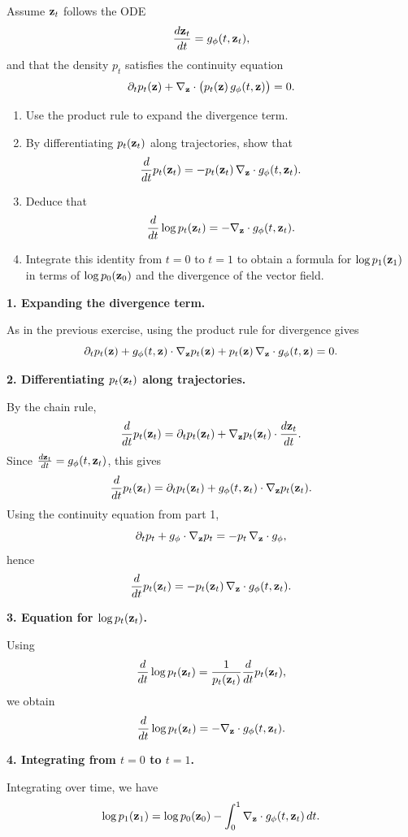 \begin{exercise}
Assume \({ \mathbf{z}}_t\) follows the ODE
\[
\frac{d{ \mathbf{z}}_t}{dt}=g_\phi(t,{ \mathbf{z}}_t),
\]
and that the density \(p_t\) satisfies the continuity equation
\[
\partial_t p_t({ \mathbf{z}})+\nabla_{ \mathbf{z}}\cdot\bigl(p_t({ \mathbf{z}})\,g_\phi(t,{ \mathbf{z}})\bigr)=0.
\]

\begin{enumerate}
\item Use the product rule to expand the divergence term.
\item By differentiating \(p_t({ \mathbf{z}}_t)\) along trajectories, show that
\[
\frac{d}{dt} p_t({ \mathbf{z}}_t)
=
-p_t({ \mathbf{z}}_t)\,\nabla_{ \mathbf{z}}\cdot g_\phi(t,{ \mathbf{z}}_t).
\]
\item Deduce that
\[
\frac{d}{dt}\log p_t({ \mathbf{z}}_t)
=
-\nabla_{ \mathbf{z}}\cdot g_\phi(t,{ \mathbf{z}}_t).
\]
\item Integrate this identity from \(t=0\) to \(t=1\) to obtain a formula for \(\log p_1({ \mathbf{z}}_1)\) in terms of \(\log p_0({ \mathbf{z}}_0)\) and the divergence of the vector field.
\end{enumerate}
\end{exercise}

\begin{solution}

\textbf{1. Expanding the divergence term.}

As in the previous exercise, using the product rule for divergence gives 
\[
\partial_t p_t({ \mathbf{z}})
+
g_\phi(t,{ \mathbf{z}})\cdot\nabla_{ \mathbf{z}} p_t({ \mathbf{z}})
+
p_t({ \mathbf{z}})\,\nabla_{ \mathbf{z}}\cdot g_\phi(t,{ \mathbf{z}})
=0.
\]

\bigskip

\textbf{2. Differentiating \(p_t({ \mathbf{z}}_t)\) along trajectories.}

By the chain rule,
\[
\frac{d}{dt} p_t({ \mathbf{z}}_t)
=
\partial_t p_t({ \mathbf{z}}_t)
+
\nabla_{ \mathbf{z}} p_t({ \mathbf{z}}_t)\cdot \frac{d{ \mathbf{z}}_t}{dt}.
\]
Since \(\frac{d{ \mathbf{z}}_t}{dt}=g_\phi(t,{ \mathbf{z}}_t)\), this gives
\[
\frac{d}{dt} p_t({ \mathbf{z}}_t)
=
\partial_t p_t({ \mathbf{z}}_t)
+
g_\phi(t,{ \mathbf{z}}_t)\cdot\nabla_{ \mathbf{z}} p_t({ \mathbf{z}}_t).
\]
Using the continuity equation from part 1,
\[
\partial_t p_t + g_\phi\cdot\nabla_{ \mathbf{z}} p_t
=
- p_t\,\nabla_{ \mathbf{z}}\cdot g_\phi,
\]
hence
\[
\frac{d}{dt} p_t({ \mathbf{z}}_t)
=
- p_t({ \mathbf{z}}_t)\,\nabla_{ \mathbf{z}}\cdot g_\phi(t,{ \mathbf{z}}_t).
\]

\bigskip

\textbf{3. Equation for \(\log p_t({ \mathbf{z}}_t)\).}

Using
\[
\frac{d}{dt}\log p_t({ \mathbf{z}}_t)
=
\frac{1}{p_t({ \mathbf{z}}_t)}\frac{d}{dt} p_t({ \mathbf{z}}_t),
\]
we obtain
\[
\frac{d}{dt}\log p_t({ \mathbf{z}}_t)
=
-\nabla_{ \mathbf{z}}\cdot g_\phi(t,{ \mathbf{z}}_t).
\]

\bigskip

\textbf{4. Integrating from \(t=0\) to \(t=1\).}

Integrating over time, we have 
\[
\log p_1({ \mathbf{z}}_1)
=
\log p_0({ \mathbf{z}}_0)
-
\int_0^1 \nabla_{ \mathbf{z}}\cdot g_\phi(t,{ \mathbf{z}}_t)\,dt.
\]

\end{solution}

